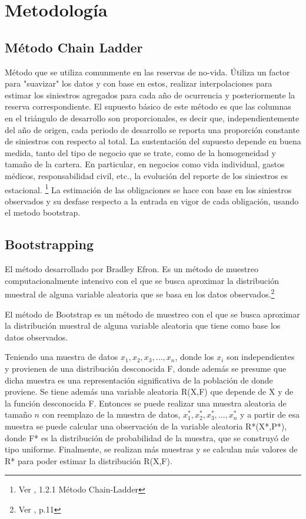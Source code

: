 \documentclass[11pt,twoside,openright,spanish]{report}
\numberwithin{equation}{chapter}
\numberwithin{figure}{chapter}
\numberwithin{table}{chapter}
\begin{document}
	\chapter{Metodología}\label{tcyedb}
	
	\doublespacing
	
	\section{Método Chain Ladder}
	\doublespacing

	Método que se utiliza comunmente en las reservas de no-vida. Útiliza un factor para "suavizar" los datos y con base en estos, realizar interpolaciones para estimar los siniestros agregados para cada año de ocurrencia y posteriormente la reserva correspondiente. El supuesto básico de este método es que las columnas en el triángulo de desarrollo son proporcionales, es decir que, independientemente del año de origen, cada periodo de desarrollo se reporta una proporción constante de siniestros con respecto al total. La sustentación del supuesto depende en buena medida, tanto del tipo de negocio que se trate, como de la homogeneidad y tamaño de la cartera. En particular, en negocios como vida individual, gastos médicos, responsabilidad civil, etc., la evolución del reporte de los siniestros es estacional. \footnote{Ver \citet{LChainLadder}, 1.2.1 Método Chain-Ladder} 
		\doublespacing
	La estimación de las obligaciones se hace con base en los siniestros observados y su desfase respecto a la entrada en vigor de cada obligación, usando el metodo bootstrap.
	
	\section{Bootstrapping}
\doublespacing	
	\doublespacing
El método desarrollado por Bradley Efron. Es un método de muestreo computacionalmente intensivo con el que se busca aproximar la distribución muestral de alguna variable aleatoria que se basa en los datos observados.\footnote{Ver \citet{MBootstrap}, p.11}

El método de Bootstrap es un método de muestreo con el que se busca aproximar la distribución muestral de alguna variable aleatoria que tiene como base los datos observados.

\doublespacing

Teniendo una muestra de datos $x_{1},x_{2},x_{3},...,x_{n}$, donde los $x_{i}$ son independientes y provienen de una distribución desconocida F, donde además se presume que dicha muestra es una representación significativa de la población de donde proviene. Se tiene además una variable aleatoria R(X,F) que depende de X y de la función desconocida F. Entonces se puede realizar una muestra aleatoria de tamaño $n$ con reemplazo de la muestra de datos, $x_{1}^{*},x_{2}^{*},x_{3}^{*},...,x_{n}^{*}$ y a partir de esa muestra se puede calcular una observación de la variable aleatoria R*(X*,P*), donde F* es la distribución de probabilidad de la muestra, que se construyó de tipo uniforme. Finalmente, se realizan más muestras y se calculan más valores de R* para poder estimar la distribución R(X,F).
\end{document}

